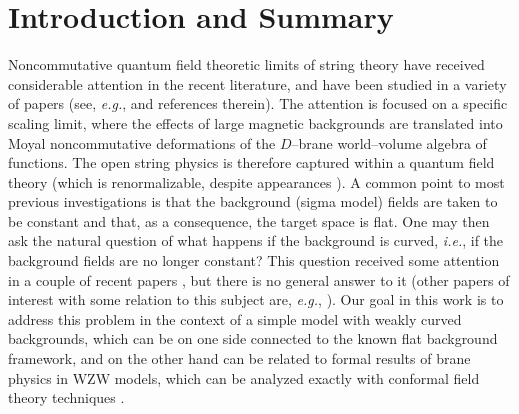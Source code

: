\documentclass[a4paper,11pt]{article}
\begin{document}
\renewcommand{\thefootnote}{\arabic{footnote}} \setcounter{footnote}{0}

\newpage \begin{tableofcontents}
\end{tableofcontents}
\pagebreak


\section{Introduction and Summary}


Noncommutative quantum field theoretic limits of string theory have
received considerable attention in the recent literature, and have been
studied in a variety of papers (see, \textit{e.g.}, \cite{CDS,
Cheung-Krogh, Schomerus, Cornalba-Schiappa, Seiberg-Witten, Cornalba-2} and
references therein). The attention is focused on a specific scaling limit,
where the effects of large magnetic backgrounds are translated into Moyal
noncommutative deformations of the $D$--brane world--volume algebra of
functions. The open string physics is therefore captured within a quantum
field theory (which is renormalizable, despite appearances \cite{MRS,
MST}). A common point to most previous investigations is that the
background (sigma model) fields are taken to be constant and that, as a
consequence, the target space is flat. One may then ask the natural
question of what happens if the background is curved, \textit{i.e.}, if the
background fields are no longer constant?  This question received some
attention in a couple of recent papers \cite{Anazawa, ARS-1, ARS-2,
Ho-Yeh}, but there is no general answer to it (other papers of interest
with some relation to this subject are, \textit{e.g.}, \cite{Chu-Ho-Kao,
Ydri, Sahakian, Dasgupta-Yin}). Our goal in this work is to address this
problem in the context of a simple model with weakly curved backgrounds,
which can be on one side connected to the known flat background framework,
and on the other hand can be related to formal results of brane physics in
WZW models, which can be analyzed exactly with conformal field theory
techniques \cite{ARS-1, ARS-2, BSD}.
\end{document}
